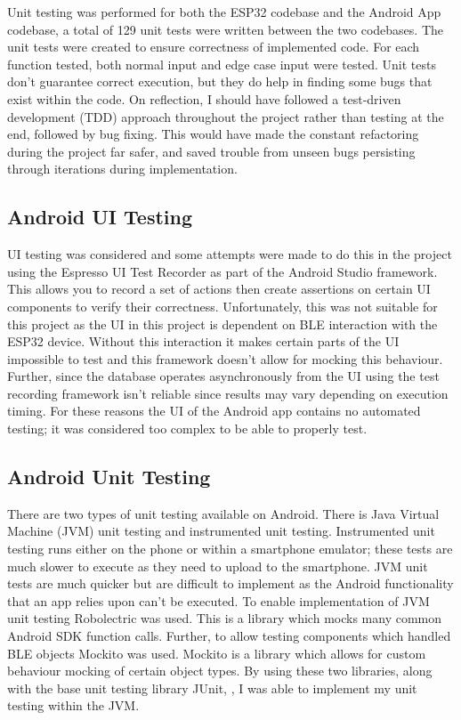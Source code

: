 \documentclass{l4proj}
\begin{document}
Unit testing was performed for both the ESP32 codebase and the Android App codebase, a total of 129 unit tests were written between the two codebases. The unit tests were created to ensure correctness of implemented code. For each function tested, both normal input and edge case input were tested. Unit tests don't guarantee correct execution, but they do help in finding some bugs that exist within the code. On reflection, I should have followed a test-driven development (TDD) approach throughout the project rather than testing at the end, followed by bug fixing. This would have made the constant refactoring during the project far safer, and saved trouble from unseen bugs persisting through iterations during implementation.

\subsection{Android UI Testing}

UI testing was considered and some attempts were made to do this in the project using the Espresso UI Test Recorder as part of the Android Studio framework. This allows you to record a set of actions then create assertions on certain UI components to verify their correctness. Unfortunately, this was not suitable for this project as the UI in this project is dependent on BLE interaction with the ESP32 device. Without this interaction it makes certain parts of the UI impossible to test and this framework doesn't allow for mocking this behaviour. Further, since the database operates asynchronously from the UI using the test recording framework isn't reliable since results may vary depending on execution timing. For these reasons the UI of the Android app contains no automated testing; it was considered too complex to be able to properly test.

\subsection{Android Unit Testing}

There are two types of unit testing available on Android. There is Java Virtual Machine (JVM) unit testing and instrumented unit testing. Instrumented unit testing runs either on the phone or within a smartphone emulator; these tests are much slower to execute as they need to upload to the smartphone. JVM unit tests are much quicker but are difficult to implement as the Android functionality that an app relies upon can't be executed. To enable implementation of JVM unit testing Robolectric \citep{robolectric_robolectric_2019} was used. This is a library which mocks many common Android SDK function calls. Further, to allow testing components which handled BLE objects Mockito \citep{faber_mockito_2020} was used. Mockito is a library which allows for custom behaviour mocking of certain object types. By using these two libraries, along with the base unit testing library JUnit, \citep{junit_team_junit_2020}, I was able to implement my unit testing within the JVM.
\end{document}
